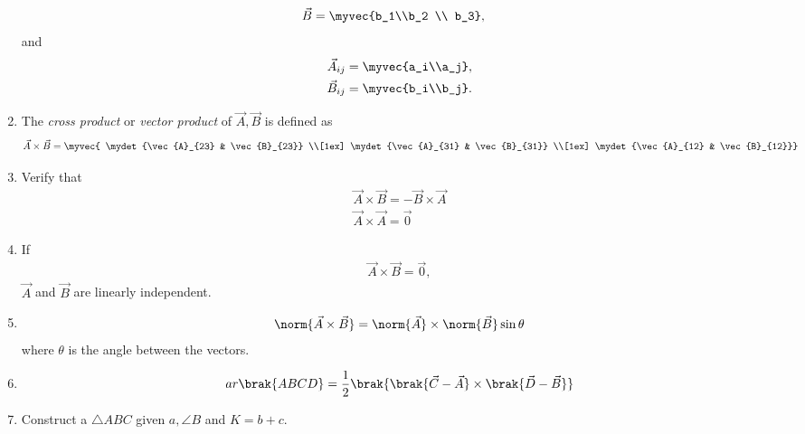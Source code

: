 \begin{enumerate}[label=\thesubsubsection.\arabic*.,ref=\thesubsubsection.\theenumi]
\begin{align}
  \\
  \vec{B} &= \myvec{b_1\\b_2 \\ b_3}, 
\end{align}
and 
\begin{align}
  \label{eq:cross3d-submat}
\begin{split}
  \vec{A}_{ij} &= \myvec{a_i\\a_j}, 
  \\
  \vec{B}_{ij} &= \myvec{b_i\\b_j}. 
\end{split}
\end{align}

\item The {\em cross product} or {\em vector product} of $\vec{A}, \vec{B}$ is defined as
\begin{align}
  \label{eq:cross3d}
	\vec{A} \times \vec{B} 
	 = \myvec{ \mydet{\vec{A}_{23} & \vec{B}_{23}} \\[1ex] \mydet{\vec{A}_{31} & \vec{B}_{31}} \\[1ex] \mydet{\vec{A}_{12}  & \vec{B}_{12}}}
\end{align}
\item Verify that
\begin{align}
  \label{eq:cross3d-commute}
  \vec{A} \times \vec{B} = -  \vec{B} \times \vec{A} 
  \\
  \label{eq:cross3d-same}
  \vec{A} \times \vec{A} = \vec{0}
\end{align}
\item If 
		\label{prop:lin-dep-cross}
\begin{align}
  \vec{A} \times \vec{B} = \vec{0},
\end{align}
  $\vec{A}$ and $ \vec{B} $ are linearly independent.
  \item 
\begin{align}
	\label{eq:cross-sin}
	\norm{ \vec{A} \times \vec{B} }
	=
	\norm{\vec{A}} \times 	\norm{\vec{B}} \sin \theta
\end{align}
where $\theta$ is the angle between the vectors.
\item 
\begin{align}
	ar\brak{ABCD} = 
         \frac{1}{2}\brak{\brak{\vec{C}-\vec{A}}\times\brak{\vec{D}-\vec{B}}} \\
        \label{eq:11/10/1/1area-diag} 
\end{align}
\item Construct a $\triangle ABC$ given $a, \angle B$ and $K = b+c$.
		\label{prob:9/11/2/1}

\end{enumerate}
